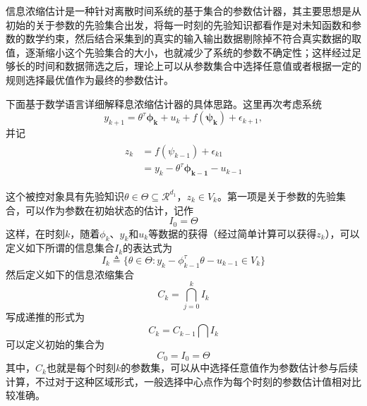信息浓缩估计是一种针对离散时间系统的基于集合的参数估计器，其主要思想是从初始的关于参数的先验集合出发，将每一时刻的先验知识都看作是对未知函数和参数的数学约束，然后结合采集到的真实的输入输出数据剔除掉不符合真实数据的取值，逐渐缩小这个先验集合的大小，也就减少了系统的参数不确定性；这样经过足够长的时间和数据筛选之后，理论上可以从参数集合中选择任意值或者根据一定的规则选择最优值作为最终的参数估计。

下面基于数学语言详细解释息浓缩估计器的具体思路。这里再次考虑系统
\begin{equation}%
\label{eq:semi-u2}
y_{k+1} = \theta^{\tau}\bm{\phi_{k}}+u_{k}+f(\bm{\psi_{k}})+\epsilon_{k+1},
\end{equation}
并记
\begin{eqnarray}
\label{eq:zk}
\begin{split}%
z_{k} & = f(\psi_{k-1}) + \epsilon_{k1}\\
& = y_{k}-\theta^{\tau}\bm{\phi_{k-1}}-u_{k-1}
\end{split}
\end{eqnarray}

这个被控对象具有先验知识$\theta\in\Theta\subseteq\mathcal{R}^{d_{1}}$，$z_{k}\in V_{k}$。第一项是关于参数的先验集合，可以作为参数在初始状态的估计，记作
\begin{equation}%
I_{0}=\Theta
\end{equation}
这样，在时刻$k$，随着$\phi_{k}$、$y_{k}$和$u_{k}$等数据的获得（经过简单计算可以获得$z_{k}$），可以定义如下所谓的信息集合$I_{k}$的表达式为
\begin{equation}
\label{eq.Ik}
I_{k}\triangleq\{\theta\in\Theta\colon y_{k}-\phi_{k-1}^{\tau}\theta-u_{k-1}\in V_{k}\}
\end{equation}
然后定义如下的信息浓缩集合
\begin{equation}
\label{eq.CkIk}
C_{k} = \bigcap_{j=0}^{k}I_{k}
\end{equation}
写成递推的形式为
\begin{equation}
\label{eq.Ck2}
C_{k} = C_{k-1} \bigcap I_{k}
\end{equation}
可以定义初始的集合为
\begin{equation}
\label{eq.C0}
C_{0}=I_{0}=\Theta
\end{equation}
其中，$C_{k}$也就是每个时刻$k$的参数集，可以从中选择任意值作为参数估计参与后续计算，不过对于这种区域形式，一般选择中心点作为每个时刻的参数估计值相对比较准确。


